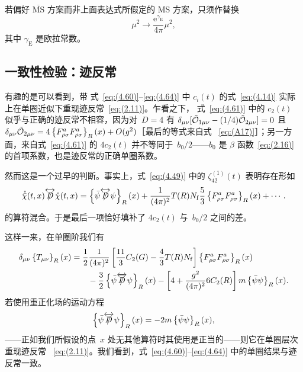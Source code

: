 若偏好 $\overline{\text{MS}}$ 方案而非上面表达式所假定的 $\text{MS}$
方案，只须作替换
\begin{equation}
    \mu^2\to\frac{\mathrm{e}^{\gamma_{\mathrm{E}}}}{4\pi}\mu^2,
\label{eq:(4.65)}
\end{equation}
其中 $\gamma_{\mathrm{E}}$ 是欧拉常数。

\subsection{一致性检验：迹反常}
有趣的是可以看到，带
式~\eqref{eq:(4.60)}--\eqref{eq:(4.64)} 中 $c_i(t)$ 的式~\eqref{eq:(4.14)}
实际上在单圈近似下重现迹反常~\eqref{eq:(2.11)}。乍看之下，
式~\eqref{eq:(4.61)} 中的 $c_2(t)$ 似乎与正确的迹反常不相容，因为对~$D=4$
有 $\delta_{\mu\nu}[\Tilde{\mathcal{O}}_{1\mu\nu}
-(1/4)\Tilde{\mathcal{O}}_{2\mu\nu}]=0$
且 $\delta_{\mu\nu}\Tilde{\mathcal{O}}_{2\mu\nu}
=4\left\{F_{\rho\sigma}^aF_{\rho\sigma}^a\right\}_R(x)+O(g^2)$［最后的等式来自式%
~\eqref{eq:(A17)}］；另一方面，来自式~\eqref{eq:(4.61)} 的 $4c_2(t)$
并不等同于~$b_0/2$——$b_0$ 是 $\beta$ 函数~\eqref{eq:(2.16)}
的首项系数，也是迹反常的正确单圈系数。

然而这是一个过早的判断。事实上，式~\eqref{eq:(4.49)} 中的 $\zeta_{42}^{(1)}(t)$
表明存在形如
\begin{equation}
   \mathring{\Bar{\chi}}(t,x)
   \overleftrightarrow{\Slash{D}}
   \mathring{\chi}(t,x)
   =\left\{\Bar{\psi}\overleftrightarrow{\Slash{D}}\psi\right\}_R(x)
   +\frac{1}{(4\pi)^2}T(R)N_{\mathrm{f}}\frac{5}{3}
   \left\{F_{\rho\sigma}^aF_{\rho\sigma}^a\right\}_R(x)
   +\dotsb.
\label{eq:(4.66)}
\end{equation}
的算符混合。于是最后一项恰好填补了 $4c_2(t)$
与~$b_0/2$ 之间的差。

这样一来，在单圈阶我们有
\begin{align}
   \delta_{\mu\nu}\left\{T_{\mu\nu}\right\}_R(x)
   &=\frac{1}{2}\frac{1}{(4\pi)^2}
   \left[\frac{11}{3}C_2(G)-\frac{4}{3}T(R)N_{\mathrm{f}}\right]
   \left\{F_{\rho\sigma}^aF_{\rho\sigma}^a\right\}_R(x)
\notag\\
   &\qquad{}
   -\frac{3}{2}
   \left\{\Bar{\psi}\overleftrightarrow{\Slash{D}}\psi\right\}_R(x)
   -\left[4+\frac{g^2}{(4\pi)^2}6C_2(R)\right]
   m\left\{\Bar{\psi}\psi\right\}_R(x).
\label{eq:(4.67)}
\end{align}
若使用重正化场的运动方程
\begin{equation}
   \left\{\Bar{\psi}\overleftrightarrow{\Slash{D}}\psi\right\}_R(x)
   =-2m\left\{\Bar{\psi}\psi\right\}_R(x),
\label{eq:(4.68)}
\end{equation}
——正如我们所假设的点~$x$ 处无其他算符时其使用是正当的——则它在单圈层次重现迹反常%
~\eqref{eq:(2.11)}。我们看到，式~\eqref{eq:(4.60)}--\eqref{eq:(4.64)}
中的单圈结果与迹反常一致。

